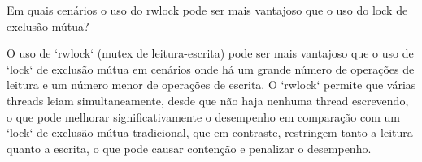 \question Em quais cenários o uso do rwlock pode ser mais vantajoso que o uso do lock de
exclusão mútua?
\begin{solution}
    O uso de `rwlock` (mutex de leitura-escrita) pode ser mais vantajoso que o uso de `lock` de exclusão mútua em cenários onde há um grande número de operações de leitura e um número menor de operações de escrita. O `rwlock` permite que várias threads leiam simultaneamente, desde que não haja nenhuma thread escrevendo, o que pode melhorar significativamente o desempenho em comparação com um `lock` de exclusão mútua tradicional, que em contraste, restringem tanto a leitura quanto a escrita, o que pode causar contenção e penalizar o desempenho.
\end{solution}
